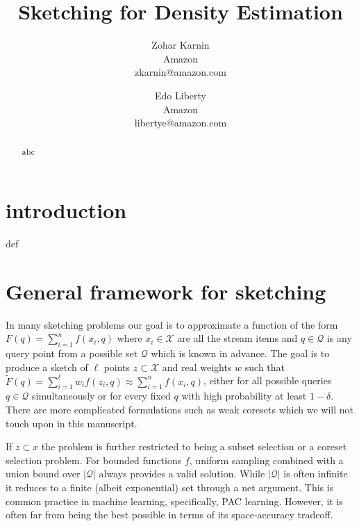 \documentclass{article} %
\title{Sketching for Density Estimation}
\date{\nonumber}
\author{
Zohar Karnin\\Amazon\\zkarnin@amazon.com
\and
Edo Liberty\\Amazon\\libertye@amazon.com
}
\begin{document}
\maketitle

\begin{abstract}
abc
\end{abstract}

\section{introduction}
def

\section{General framework for sketching}
In many sketching problems our goal is to approximate a function of the form $F(q) = \sum_{i=1}^{n} f(x_i, q)$ where $x_i \in \mathcal X$ are all the stream items and $q \in \mathcal Q$ is any query point from a possible set $\mathcal Q$ which is known in advance.
The goal is to produce a sketch of $\ell$ points $z \subset \mathcal X$ and real weights $w$ such that $\tilde F(q) = \sum_{i=1}^{\ell}w_i f(z_i,q) \approx \sum_{i=1}^{n} f(x_i, q)$, either for all possible queries $q \in \mathcal Q$ simultaneously or for every fixed $q$ with high probability at least $1-\delta$. There are more complicated formulations such as weak coresets which we will not touch upon in this manuscript.
 
If $z \subset x$ the problem is further restricted to being a subset selection or a coreset selection problem. 
For bounded functions $f$, uniform sampling combined with a union bound over $|\mathcal Q|$ always provides a valid solution. 
While $|\mathcal Q|$ is often infinite it reduces to a finite (albeit exponential) set through a net argument. 
This is common practice in machine learning, specifically, PAC learning. 
However, it is often far from being the best possible in terms of its space-accuracy tradeoff. 
\end{document}
